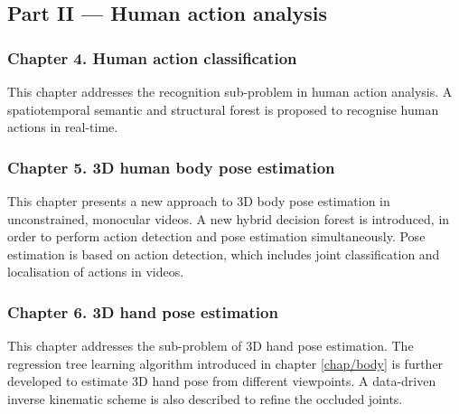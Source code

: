 \subsection*{Part II --- Human action analysis}


\subsubsection*{Chapter 4. Human action classification} 
This chapter addresses the recognition sub-problem in human action analysis. A spatiotemporal semantic and structural forest is proposed to recognise human actions in real-time.    

\subsubsection*{Chapter 5. 3D human body pose estimation} 
This chapter presents a new approach to 3D body pose estimation in unconstrained, monocular videos. 
A new hybrid decision forest is introduced, in order to perform action detection and pose estimation simultaneously. 
Pose estimation is based on action detection, which includes joint classification and localisation of actions in videos. 

\subsubsection*{Chapter 6. 3D hand pose estimation} 
This chapter addresses the sub-problem of 3D hand pose estimation. 
The regression tree learning algorithm introduced in chapter \ref{chap/body} is further developed to estimate 3D hand pose from different viewpoints. 
A data-driven inverse kinematic scheme is also described to refine the occluded joints.

